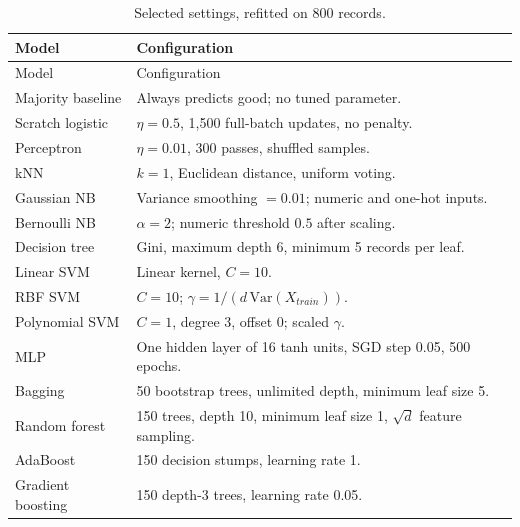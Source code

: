\begin{longtable}{@{}p{3.6cm}p{10.9cm}@{}}
\caption{Selected settings, refitted on 800 records.}\label{tab:settings}\\
\toprule
Model & Configuration \\
\midrule\endfirsthead
\toprule
Model & Configuration \\
\midrule\endhead
\bottomrule\endfoot
Majority baseline & Always predicts good; no tuned parameter. \\
Scratch logistic & $\eta=0.5$, 1,500 full-batch updates, no penalty. \\
Perceptron & $\eta=0.01$, 300 passes, shuffled samples. \\
kNN & $k=1$, Euclidean distance, uniform voting. \\
Gaussian NB & Variance smoothing $=0.01$; numeric and one-hot inputs. \\
Bernoulli NB & $\alpha=2$; numeric threshold $0.5$ after scaling. \\
Decision tree & Gini, maximum depth 6, minimum 5 records per leaf. \\
Linear SVM & Linear kernel, $C=10$. \\
RBF SVM & $C=10$; $\gamma=1/(d\,\mathrm{Var}(X_{train}))$. \\
Polynomial SVM & $C=1$, degree 3, offset 0; scaled $\gamma$. \\
MLP & One hidden layer of 16 tanh units, SGD step 0.05, 500 epochs. \\
Bagging & 50 bootstrap trees, unlimited depth, minimum leaf size 5. \\
Random forest & 150 trees, depth 10, minimum leaf size 1, $\sqrt d$ feature sampling. \\
AdaBoost & 150 decision stumps, learning rate 1. \\
Gradient boosting & 150 depth-3 trees, learning rate 0.05. \\
\end{longtable}